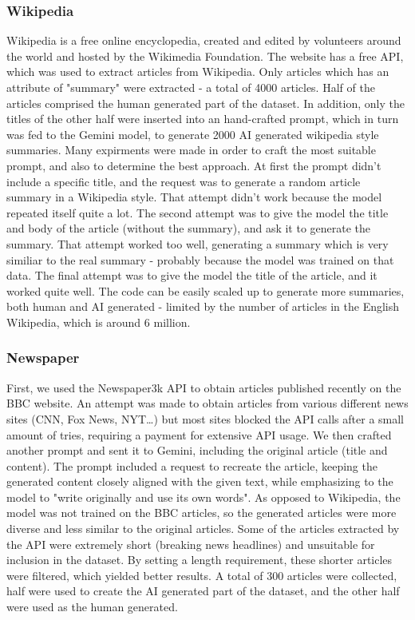 \documentclass[11pt]{article}
\begin{document}
\subsubsection{Wikipedia}
Wikipedia is a free online encyclopedia, created and edited by volunteers around the world and hosted by the Wikimedia Foundation.
The website has a free API, which was used to extract articles from Wikipedia. Only articles which has an attribute of "summary" were extracted - a total of 4000 articles. Half of the articles comprised the human generated part of the dataset. In addition, only the titles of the other half were inserted into an hand-crafted prompt, which in turn was fed to the Gemini model, to generate 2000 AI generated wikipedia style summaries. Many expirments were made in order to craft the most suitable prompt, and also to determine the best approach. At first the prompt didn't include a specific title, and the request was to generate a random article summary in a Wikipedia style. That attempt didn't work because the model repeated itself quite a lot. The second attempt was to give the model the title and body of the article (without the summary), and ask it to generate the summary. That attempt worked too well, generating a summary which is very similiar to the real summary - probably because the model was trained on that data. The final attempt was to give the model the title of the article, and it worked quite well. The code can be easily scaled up to generate more summaries, both human and AI generated - limited by the number of articles in the English Wikipedia, which is around 6 million.
\subsubsection{Newspaper}
First, we used the Newspaper3k API to obtain articles published recently on the BBC website. An attempt was made to obtain articles from various different news sites (CNN, Fox News, NYT…) but most sites blocked the API calls after a small amount of tries, requiring a payment for extensive API usage. We then crafted another prompt and sent it to Gemini, including the original article (title and content). The prompt included a request to recreate the article, keeping the generated content closely aligned with the given text, while emphasizing to the model to "write originally and use its own words". As opposed to Wikipedia, the model was not trained on the BBC articles, so the generated articles were more diverse and less similar to the original articles. Some of the articles extracted by the API were extremely short (breaking news headlines) and unsuitable for inclusion in the dataset. By setting a length requirement, these shorter articles were filtered, which yielded better results. A total of 300 articles were collected, half were used to create the AI generated part of the dataset, and the other half were used as the human generated.
\end{document}
